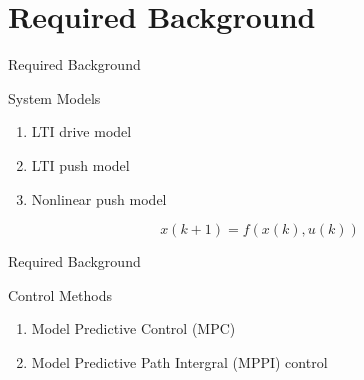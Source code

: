 \section{Required Background}
\begin{frame}[fragile]{Required Background} 
\begin{block}{System Models}
\begin{enumerate}
  \item LTI drive model\pause
  \item LTI push model\pause
  \item Nonlinear push model
\end{enumerate}\pause
\end{block}

\begin{example}{}
\[x(k+1) = f(x(k), u(k))\]
\end{example}
\end{frame}

\begin{frame}[fragile]{Required Background} 
\begin{block}{Control Methods}
\begin{enumerate}
  \item Model Predictive Control (MPC)
  \item Model Predictive Path Intergral (MPPI) control
\end{enumerate}
\end{block}



\end{frame}

